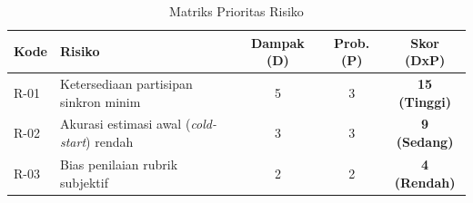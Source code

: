 \begin{table}[H]
    \centering
    \caption{Matriks Prioritas Risiko}
    \label{tbl:matriks_risiko}
    \begin{tabular}{|l|p{}|c|c|c|}
        \hline
        \textbf{Kode} & \textbf{Risiko} & \textbf{Dampak (D)} & \textbf{Prob. (P)} & \textbf{Skor (DxP)} \\
        \hline
        R-01 & Ketersediaan partisipan sinkron minim & 5 & 3 & \textbf{15 (Tinggi)} \\
        \hline
        R-02 & Akurasi estimasi awal (\textit{cold-start}) rendah & 3 & 3 & \textbf{9 (Sedang)} \\
        \hline
        R-03 & Bias penilaian rubrik subjektif & 2 & 2 & \textbf{4 (Rendah)} \\
        \hline
    \end{tabular}
\end{table}